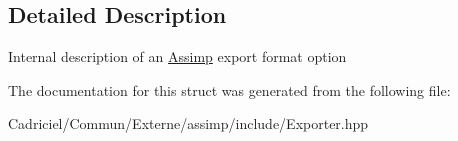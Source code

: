\subsection{Detailed Description}
Internal description of an \hyperlink{namespace_assimp}{Assimp} export format option 

The documentation for this struct was generated from the following file\+:\begin{DoxyCompactItemize}
\item 
Cadriciel/\+Commun/\+Externe/assimp/include/Exporter.\+hpp\end{DoxyCompactItemize}
